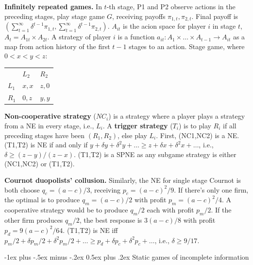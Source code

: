\documentclass[a4paper,11pt,landscape]{article}
\makeatletter
\renewcommand{\section}{\@startsection{section}{1}{0mm}%
                                {-1ex plus -.5ex minus -.2ex}%
                                {0.5ex plus .2ex}%
                                {\normalfont\large\bfseries}}
\makeatother
\begin{document}
\begin{multicols*}{3}
\textbf{Infinitely repeated games.} In $t$-th stage, P1 and P2 observe actions in the preceding stages, play stage game $G$, receiving payoffs $\pi_{1,t},\pi_{2,t}$. Final payoff is $(\sum_{t=1}^\infty\delta^{t-1}\pi_{1,t}, \sum_{t=1}^\infty\delta^{t-1}\pi_{2,t})$. $A_{it}$ is the acion space for player $i$ in stage $t$, $A_t=A_{1t}\times A_{2t}$. A strategy of player $i$ is a function $a_{it}:A_1\times\ldots\times A_{t-1}\to A_{it}$ as a map from action history of the first $t-1$ stages to an action. Stage game, where $0<x<y<z$:
\vspace*{-8pt}
\begin{center}
    \begin{tabular}{lll}
                               & $L_2$                      & $R_2$                      \\ \cline{2-3} 
    \multicolumn{1}{l|}{$L_1$} & \multicolumn{1}{l|}{$x,x$} & \multicolumn{1}{l|}{$z,0$} \\ \cline{2-3} 
    \multicolumn{1}{l|}{$R_1$} & \multicolumn{1}{l|}{$0,z$} & \multicolumn{1}{l|}{$y,y$} \\ \cline{2-3} 
    \end{tabular}
\end{center}

\textbf{Non-cooperative strategy} ($NC_i$) is a strategy where a player plays a strategy from a NE in every stage, i.e., $L_i$. A \textbf{trigger strategy} ($T_i$) is to play $R_i$ if all preceding stages have been $(R_1,R_2)$, else play $L_i$. First, (NC1,NC2) is a NE. (T1,T2) is NE if and only if $y+\delta y+\delta^2y+\ldots\geq z+\delta x+\delta^2x+\ldots$, i.e., $\delta\geq(z-y)/(z-x)$. (T1,T2) is a SPNE as any subgame strategy is either (NC1,NC2) or (T1,T2).

\textbf{Cournot duopolists' collusion.} Similarly, the NE for single stage Cournot is both choose $q_c=(a-c)/3$, receiving $p_c=(a-c)^2/9$. If there's only one firm, the optimal is to produce $q_m=(a-c)/2$ with profit $p_m=(a-c)^2/4$. A cooperative strategy would be to produce $q_m/2$ each with profit $p_m/2$. If the other firm produces $q_m/2$, the best response is $3(a-c)/8$ with profit $p_d=9(a-c)^2/64$. (T1,T2) is NE iff $p_m/2+\delta p_m/2+\delta^2 p_m/2+\ldots\geq p_d + \delta p_c+\delta^2p_c+\ldots$, i.e., $\delta\geq9/17$.

\section{Static games of incomplete information}


\end{multicols*}
\end{document}
